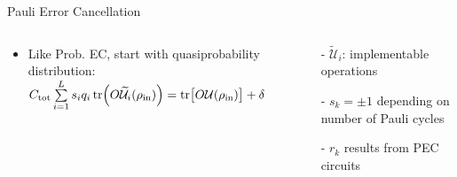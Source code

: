 \documentclass[11pt,aspectratio=1610,xcolor=dvipsnames]{beamer}
\begin{document}
\begin{frame}{Pauli Error Cancellation}
	\begin{columns}
		\begin{column}{0.6\textwidth}
			\begin{itemize}
				\item Like Prob. EC, start with quasiprobability distribution: $C_\text{tot}\sum\limits_{i = 1}^L s_i q_i \tr(O\widetilde{\mathcal{U}}_i(\rho_\text{in})) = \tr\!\qty\big[O\mathcal{U}(\rho_\text{in})] + \delta$
			\end{itemize}
		\end{column}
		\begin{column}{0.45\textwidth}
			\begin{tcolorbox}[variables]
				- $\widetilde{\mathcal{U}}_i$: implementable operations


				- $s_k = \pm 1$ depending on number of Pauli cycles

				- $r_k$ results from PEC circuits
			\end{tcolorbox}
		\end{column}
	\end{columns}

\end{frame}
\end{document}
